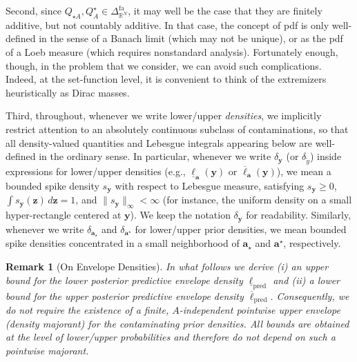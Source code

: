 \documentclass[12pt, english, oneside, a4paper]{article}
\newtheorem{remark}{Remark}
\renewcommand{\a}{\boldsymbol{a}}
\begin{document}
Second, since $Q_{\star A},Q_{A}^\star \in \Delta_{\mathbb{R}^N}^\text{fa}$, it may well be the case that they are finitely additive, but not countably additive. In that case, the concept of pdf is only well-defined in the sense of a Banach limit (which may not be unique), or as the pdf of a Loeb measure (which requires nonstandard analysis). Fortunately enough, though, in the problem that we consider, we can avoid such complications. Indeed, at the set-function level, it is convenient to think of the extremizers heuristically as Dirac masses.

Third, throughout, whenever we write lower/upper {\em densities}, we implicitly restrict attention to an absolutely continuous subclass of contaminations, 
so that all density-valued quantities and Lebesgue integrals appearing below are well-defined in the ordinary sense. In particular, whenever we write $\delta_{\mathbf y}$ (or $\delta_{\tilde y}$) inside expressions for lower/upper densities (e.g., $\underline{\ell}_{\a}(\mathbf y)$ or $\overline{\ell}_{\a}(\mathbf y)$), we mean a bounded spike density $s_{\mathbf y}$ with respect to Lebesgue measure, satisfying $s_{\mathbf y}\ge 0$, $\int s_{\mathbf y}(\mathbf z)\, d\mathbf z=1$, and $\|s_{\mathbf y}\|_{\infty}<\infty$ (for instance, the uniform density on a small hyper-rectangle centered at $\mathbf y$). We keep the notation $\delta_{\mathbf y}$ for readability. Similarly, whenever we write $\delta_{\a_\star}$ and $\delta_{\a^\star}$ for lower/upper prior densities, we mean bounded spike densities concentrated in a small neighborhood of $\a_\star$ and $\a^\star$, respectively.

\begin{remark}[On Envelope Densities]\label{rem:env-densities}
In what follows we derive (i) an \emph{upper bound} for the lower posterior predictive envelope density
$\underline{\ell}_{\mathrm{pred}}$ and (ii) a \emph{lower bound} for the upper posterior predictive envelope density
$\overline{\ell}_{\mathrm{pred}}$.
Consequently, we do \emph{not} require the existence of a finite, $A$-independent pointwise upper envelope (density majorant)
for the contaminating prior densities.
All bounds are obtained at the level of lower/upper probabilities 
and therefore do not
depend on such a pointwise majorant.
\end{remark}
\end{document}
